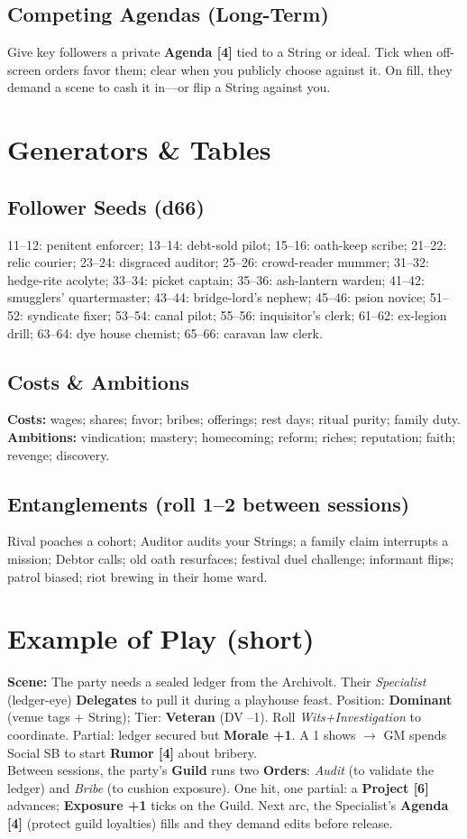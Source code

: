 \subsection{Competing Agendas (Long-Term)}
Give key followers a private \textbf{Agenda [4]} tied to a String or ideal. Tick when off-screen orders favor them; clear when you publicly choose against it. On fill, they demand a scene to cash it in---or flip a String against you.

\section{Generators \& Tables}
\subsection{Follower Seeds (d66)}
11--12: penitent enforcer; 13--14: debt-sold pilot; 15--16: oath-keep scribe; 21--22: relic courier; 23--24: disgraced auditor; 25--26: crowd-reader mummer; 31--32: hedge-rite acolyte; 33--34: picket captain; 35--36: ash-lantern warden; 41--42: smugglers' quartermaster; 43--44: bridge-lord's nephew; 45--46: psion novice; 51--52: syndicate fixer; 53--54: canal pilot; 55--56: inquisitor's clerk; 61--62: ex-legion drill; 63--64: dye house chemist; 65--66: caravan law clerk.

\subsection{Costs \& Ambitions}
\textbf{Costs:} wages; shares; favor; bribes; offerings; rest days; ritual purity; family duty.\\
\textbf{Ambitions:} vindication; mastery; homecoming; reform; riches; reputation; faith; revenge; discovery.

\subsection{Entanglements (roll 1--2 between sessions)}
Rival poaches a cohort; Auditor audits your Strings; a family claim interrupts a mission; Debtor calls; old oath resurfaces; festival duel challenge; informant flips; patrol biased; riot brewing in their home ward.

\section{Example of Play (short)}
\textbf{Scene:} The party needs a sealed ledger from the Archivolt. Their \emph{Specialist} (ledger-eye) \textbf{Delegates} to pull it during a playhouse feast. Position: \textbf{Dominant} (venue tags + String); Tier: \textbf{Veteran} (DV --1). Roll \emph{Wits+Investigation} to coordinate. Partial: ledger secured but \textbf{Morale +1}. A 1 shows $\to$ GM spends Social SB to start \textbf{Rumor [4]} about bribery.\\
Between sessions, the party's \textbf{Guild} runs two \textbf{Orders}: \emph{Audit} (to validate the ledger) and \emph{Bribe} (to cushion exposure). One hit, one partial: a \textbf{Project [6]} advances; \textbf{Exposure +1} ticks on the Guild. Next arc, the Specialist's \textbf{Agenda [4]} (protect guild loyalties) fills and they demand edits before release.

